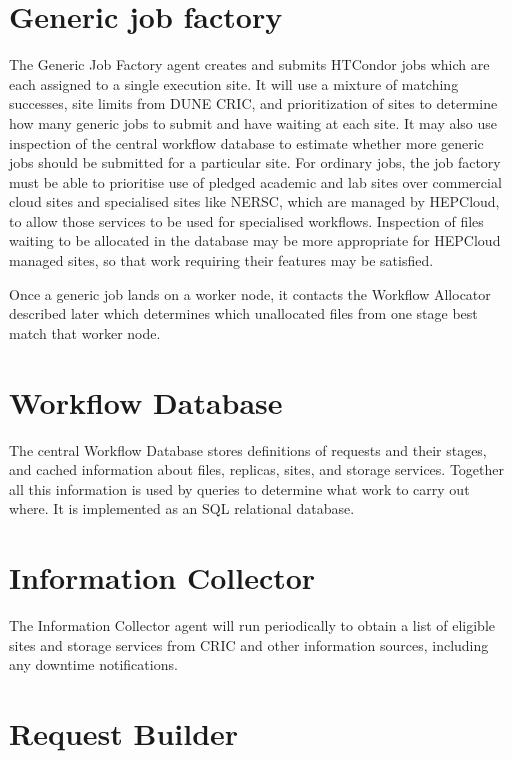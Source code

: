 \documentclass[../main-v1.tex]{subfiles}
\begin{document}
\section{Generic job factory }
\label{sec:flow:factory}

The Generic Job Factory agent creates and submits HTCondor jobs which are each assigned to a single execution site. It will use a mixture of matching successes, site limits from DUNE CRIC, and prioritization of sites to determine how many generic jobs to submit and have waiting at each site. It may also use inspection of the central workflow database to estimate whether more generic jobs should be submitted for a particular site. For ordinary jobs, the job factory must be able to prioritise use of pledged academic and lab sites over commercial cloud sites and specialised sites like NERSC, which are managed by HEPCloud, to allow those services to be used for specialised workflows. Inspection of files waiting to be allocated in the database may be more appropriate for HEPCloud managed sites, so that work requiring their features may be satisfied.

Once a generic job lands on a worker node, it contacts the Workflow Allocator described later which determines which unallocated files from one stage best match that worker node.

\section{Workflow Database }
\label{sec:flow:wfdb}

The central Workflow Database stores definitions of requests and their stages, and cached information about files, replicas, sites, and storage services. Together all this information is used by queries to determine what work to carry out where. It is implemented as an SQL relational database.

\section{Information Collector}
\label{sec:flow:collector}

The Information Collector agent will run periodically to obtain a list of eligible sites and storage services from CRIC and other information sources, including any downtime notifications. 

\section{Request Builder}
\label{sec:flow:builder}
\end{document}
